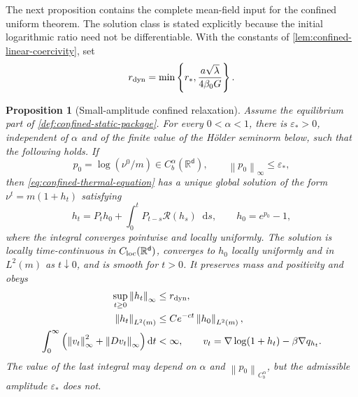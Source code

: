 \documentclass[11pt,reqno]{amsart}
\numberwithin{equation}{section}
\newtheorem{proposition}[proposition]{Proposition}
\theoremstyle{definition}
\theoremstyle{remark}
\newcommand{\R}{\mathbb R}
\renewcommand{\d}{\mathsf d}
\newcommand{\dd}{\mathop{}\!\mathrm d}
\newcommand{\norm}[1]{\left\lVert#1\right\rVert}
\begin{document}
The next proposition contains the complete mean-field input for the confined uniform theorem. The solution class is stated explicitly because the initial logarithmic ratio need not be differentiable. With the constants of \cref{lem:confined-linear-coercivity}, set
\begin{equation}\label{eq:confined-dynamical-radius}
 r_{\rm dyn}=\min\left\{r_*,\frac{a\sqrt\lambda}{4\beta_0G}\right\}.
\end{equation}

\begin{proposition}[Small-amplitude confined relaxation]\label{prop:confined-relaxation}
Assume the equilibrium part of \cref{def:confined-static-package}. For every $0<\alpha<1$, there is $\varepsilon_*>0$, independent of $\alpha$ and of the finite value of the H\"older seminorm below, such that the following holds. If
\begin{equation}\label{eq:confined-initial-log-ratio}
 p_0=\log(\nu^0/m)\in C_b^\alpha(\R^\d),
 \qquad \norm{p_0}_\infty\leq\varepsilon_*,
\end{equation}
then \eqref{eq:confined-thermal-equation} has a unique global solution of the form $\nu^t=m(1+h_t)$ satisfying
\begin{equation}\label{eq:confined-Duhamel}
 h_t=P_th_0+\int_0^tP_{t-s}\mathcal R(h_s)\dd s,
 \qquad h_0=e^{p_0}-1,
\end{equation}
where the integral converges pointwise and locally uniformly. The solution is locally time-continuous in $C_{\rm loc}(\R^\d)$, converges to $h_0$ locally uniformly and in $L^2(m)$ as $t\downarrow0$, and is smooth for $t>0$. It preserves mass and positivity and obeys
\begin{align}
 \sup_{t\geq0}\norm{h_t}_\infty&\leq r_{\rm dyn},
 \label{eq:confined-amplitude-tube}\\
 \norm{h_t}_{L^2(m)}&\leq Ce^{-ct}\norm{h_0}_{L^2(m)},
 \label{eq:confined-L2-decay}\\
 \int_0^\infty\left(
 \norm{v_t}_\infty^2+
 \norm{Dv_t}_\infty\right)\dd t&<\infty,
 \qquad v_t=\nabla\log(1+h_t)-\beta\nabla q_{h_t}.
 \label{eq:confined-thermal-field-integrability}
\end{align}
The value of the last integral may depend on $\alpha$ and $\norm{p_0}_{C_b^\alpha}$, but the admissible amplitude $\varepsilon_*$ does not.
\end{proposition}
\end{document}
